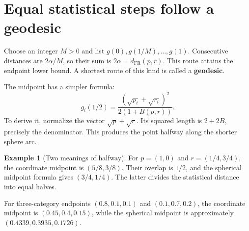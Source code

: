 \documentclass[11pt,oneside,openany]{book}
\theoremstyle{definition}
\newtheorem{example}{Example}[chapter]
\theoremstyle{remark}
\numberwithin{equation}{chapter}
\begin{document}
\section{Equal statistical steps follow a geodesic}\label{ch08-equal-statistical-steps-follow-a-geodesic}

Choose an integer \(M>0\) and list \(g(0),g(1/M),\ldots,g(1)\). Consecutive distances are \(2\alpha/M\), so their sum is \(2\alpha=d_{\mathrm{FR}}(p,r)\). This route attains the endpoint lower bound. A shortest route of this kind is called a \textbf{geodesic}.

The midpoint has a simpler formula: \[\boxed{g_i(1/2)=
\frac{(\sqrt{p_i}+\sqrt{r_i})^2}{2(1+B(p,r))}.}\] To derive it, normalize the vector \(\sqrt p+\sqrt r\). Its squared length is \(2+2B\), precisely the denominator. This produces the point halfway along the shorter sphere arc.

\begin{example}[Two meanings of halfway]

For \(p=(1,0)\) and \(r=(1/4,3/4)\), the coordinate midpoint is \((5/8,3/8)\). Their overlap is \(1/2\), and the spherical midpoint formula gives \((3/4,1/4)\). The latter divides the statistical distance into equal halves.

For three-category endpoints \((0.8,0.1,0.1)\) and \((0.1,0.7,0.2)\), the coordinate midpoint is \((0.45,0.4,0.15)\), while the spherical midpoint is approximately \((0.4339,0.3935,0.1726)\).

\end{example}
\end{document}
